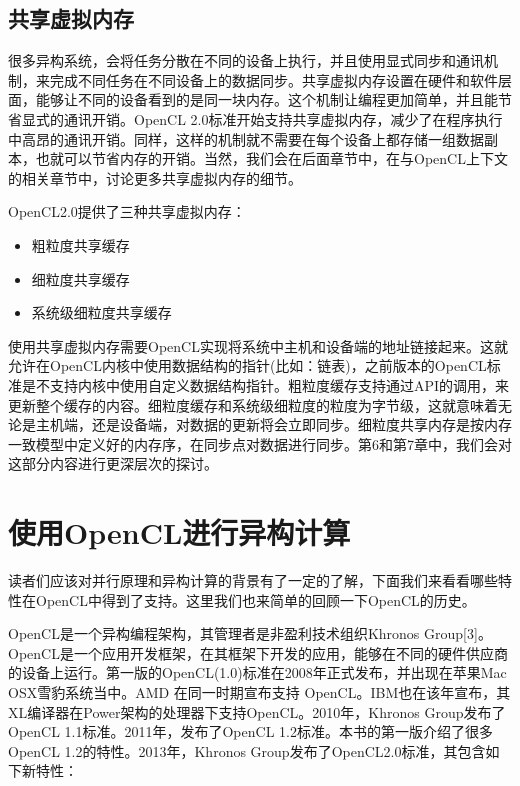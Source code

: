 \subsection{共享虚拟内存}

很多异构系统，会将任务分散在不同的设备上执行，并且使用显式同步和通讯机制，来完成不同任务在不同设备上的数据同步。共享虚拟内存设置在硬件和软件层面，能够让不同的设备看到的是同一块内存。这个机制让编程更加简单，并且能节省显式的通讯开销。OpenCL 2.0标准开始支持共享虚拟内存，减少了在程序执行中高昂的通讯开销。同样，这样的机制就不需要在每个设备上都存储一组数据副本，也就可以节省内存的开销。当然，我们会在后面章节中，在与OpenCL上下文的相关章节中，讨论更多共享虚拟内存的细节。

OpenCL2.0提供了三种共享虚拟内存：

\begin{itemize}
\item 粗粒度共享缓存
\item 细粒度共享缓存
\item 系统级细粒度共享缓存
\end{itemize}

使用共享虚拟内存需要OpenCL实现将系统中主机和设备端的地址链接起来。这就允许在OpenCL内核中使用数据结构的指针(比如：链表)，之前版本的OpenCL标准是不支持内核中使用自定义数据结构指针。粗粒度缓存支持通过API的调用，来更新整个缓存的内容。细粒度缓存和系统级细粒度的粒度为字节级，这就意味着无论是主机端，还是设备端，对数据的更新将会立即同步。细粒度共享内存是按内存一致模型中定义好的内存序，在同步点对数据进行同步。第6和第7章中，我们会对这部分内容进行更深层次的探讨。



\section{使用OpenCL进行异构计算}

读者们应该对并行原理和异构计算的背景有了一定的了解，下面我们来看看哪些特性在OpenCL中得到了支持。这里我们也来简单的回顾一下OpenCL的历史。

OpenCL是一个异构编程架构，其管理者是非盈利技术组织Khronos Group[3]。OpenCL是一个应用开发框架，在其框架下开发的应用，能够在不同的硬件供应商的设备上运行。第一版的OpenCL(1.0)标准在2008年正式发布，并出现在苹果Mac OSX雪豹系统当中。AMD 在同一时期宣布支持 OpenCL。IBM也在该年宣布，其XL编译器在Power架构的处理器下支持OpenCL。2010年，Khronos Group发布了OpenCL 1.1标准。2011年，发布了OpenCL 1.2标准。本书的第一版介绍了很多OpenCL 1.2的特性。2013年，Khronos Group发布了OpenCL2.0标准，其包含如下新特性：

